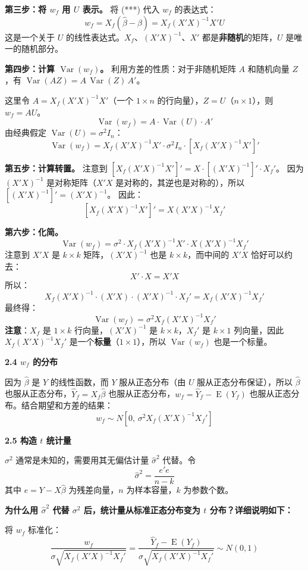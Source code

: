\documentclass[12pt,a4paper]{ctexart}
\DeclareMathOperator{\Var}{Var}
\DeclareMathOperator{\E}{E}
\begin{document}
\noindent\textbf{第三步：将 $w_f$ 用 $U$ 表示。}
将 (***) 代入 $w_f$ 的表达式：
\[
w_f = X_f(\hat{\beta}-\beta) = X_f(X'X)^{-1}X'U
\]
这是一个关于 $U$ 的线性表达式。$X_f$、$(X'X)^{-1}$、$X'$ 都是\textbf{非随机}的矩阵，$U$ 是唯一的随机部分。

\noindent\textbf{第四步：计算 $\Var(w_f)$。}
利用方差的性质：对于非随机矩阵 $A$ 和随机向量 $Z$，有 $\Var(AZ) = A\,\Var(Z)\,A'$。

这里令 $A = X_f(X'X)^{-1}X'$（一个 $1 \times n$ 的行向量），$Z = U$（$n \times 1$），则 $w_f = AU$。
\[
\Var(w_f) = A \cdot \Var(U) \cdot A'
\]
由经典假定 $\Var(U) = \sigma^2 I_n$：
\[
\Var(w_f) = X_f(X'X)^{-1}X' \cdot \sigma^2 I_n \cdot [X_f(X'X)^{-1}X']'
\]

\noindent\textbf{第五步：计算转置。}
注意到 $[X_f(X'X)^{-1}X']' = X \cdot [(X'X)^{-1}]' \cdot X_f'$。
因为 $(X'X)^{-1}$ 是对称矩阵（$X'X$ 是对称的，其逆也是对称的），所以 $[(X'X)^{-1}]' = (X'X)^{-1}$。
因此：
\[
[X_f(X'X)^{-1}X']' = X(X'X)^{-1}X_f'
\]

\noindent\textbf{第六步：化简。}
\[
\Var(w_f) = \sigma^2 \cdot X_f(X'X)^{-1}X' \cdot X(X'X)^{-1}X_f'
\]
注意到 $X'X$ 是 $k \times k$ 矩阵，$(X'X)^{-1}$ 也是 $k \times k$，而中间的 $X'X$ 恰好可以约去：
\[
X' \cdot X = X'X
\]
所以：
\[
X_f(X'X)^{-1} \cdot (X'X) \cdot (X'X)^{-1} \cdot X_f' = X_f(X'X)^{-1}X_f'
\]
最终得：
\[
\Var(w_f) = \sigma^2 X_f(X'X)^{-1}X_f'
\]
\textbf{注意}：$X_f$ 是 $1 \times k$ 行向量，$(X'X)^{-1}$ 是 $k \times k$，$X_f'$ 是 $k \times 1$ 列向量，因此 $X_f(X'X)^{-1}X_f'$ 是一个\textbf{标量}（$1 \times 1$），所以 $\Var(w_f)$ 也是一个标量。

\textbf{2.4 $w_f$ 的分布}

因为 $\hat{\beta}$ 是 $Y$ 的线性函数，而 $Y$ 服从正态分布（由 $U$ 服从正态分布保证），所以 $\hat{\beta}$ 也服从正态分布，$\hat{Y}_f = X_f\hat{\beta}$ 也服从正态分布，$w_f = \hat{Y}_f - \E(Y_f)$ 也服从正态分布。结合期望和方差的结果：
\begin{equation}
w_f \sim N[0,\, \sigma^2 X_f(X'X)^{-1}X_f'] \tag{3.59}
\end{equation}

\textbf{2.5 构造 $t$ 统计量}

$\sigma^2$ 通常是未知的，需要用其无偏估计量 $\hat{\sigma}^2$ 代替。令
\[
\hat{\sigma}^2 = \frac{e'e}{n-k}
\]
其中 $e = Y - X\hat{\beta}$ 为残差向量，$n$ 为样本容量，$k$ 为参数个数。

\textbf{为什么用 $\hat{\sigma}^2$ 代替 $\sigma^2$ 后，统计量从标准正态分布变为 $t$ 分布？详细说明如下：}

将 $w_f$ 标准化：
\[
\frac{w_f}{\sigma\sqrt{X_f(X'X)^{-1}X_f'}} = \frac{\hat{Y}_f - \E(Y_f)}{\sigma\sqrt{X_f(X'X)^{-1}X_f'}} \sim N(0,1)
\]
\end{document}
